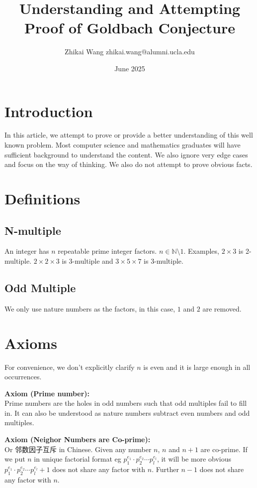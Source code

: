 \documentclass{article}
\title{Understanding and Attempting Proof of Goldbach Conjecture}
\author{Zhikai Wang zhikai.wang@alumni.ucla.edu}
\date{June 2025}
\begin{document}
\maketitle

\section{Introduction}
In this article, we attempt to prove or provide a better understanding of this well known problem. Most computer science and mathematics graduates will have sufficient background to understand the content. We also ignore very edge cases and focus on the way of thinking. We also do not attempt to prove obvious facts.
\section{Definitions}
\subsection*{N-multiple}
An integer has $n$ repeatable prime integer factors. $n \in \mathbb{N} \setminus {1}$. Examples, $2\times 3$ is 2-multiple. $2\times 2\times 3$ is 3-multiple and $3\times 5\times 7$ is 3-multiple.
\subsection*{Odd Multiple}
We only use nature numbers as the factors, in this case, $1$ and $2$ are removed.

\section{Axioms}
For convenience, we don't explicitly clarify $n$ is even and it is large enough in all occurrences.
\bigskip

\noindent \textbf{Axiom (Prime number):} \\
Prime numbers are the holes in odd numbers such that odd multiples fail to fill in. It can also be understood as nature numbers subtract even numbers and odd multiples.
\bigskip

\noindent \textbf{Axiom (Neighor Numbers are Co-prime):} \\
Or 邻数因子互斥 in Chinese. Given any number $n$, $n$ and $n+1$ are co-prime. If we put $n$ in unique factorial format eg
$p_1^{e_1} \cdot p_2^{e_2} \cdots p_l^{e_l}$, it will be more obvious $p_1^{e_1} \cdot p_2^{e_2} \cdots p_l^{e_l} + 1$ does not share any factor with $n$. Further $n-1$ does not share any factor with $n$.
\bigskip
\end{document}
